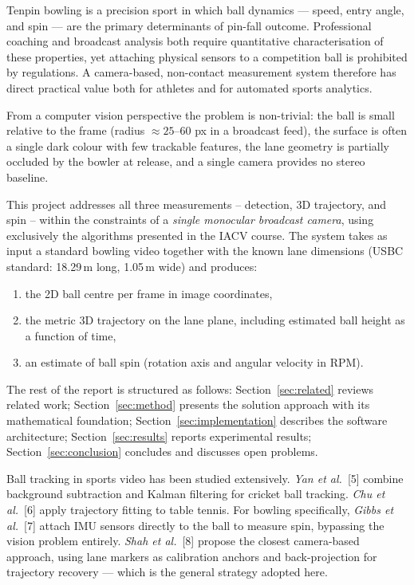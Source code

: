 \documentclass[11pt,twoside]{article}
\begin{document}
Tenpin bowling is a precision sport in which ball dynamics --- speed, entry angle, and spin --- are the primary determinants of pin-fall outcome.
Professional coaching and broadcast analysis both require quantitative characterisation of these properties, yet attaching physical sensors to a competition ball is prohibited by regulations.
A camera-based, non-contact measurement system therefore has direct practical value both for athletes and for automated sports analytics.

From a computer vision perspective the problem is non-trivial: the ball is small relative to the frame (radius $\approx 25$--$60$ px in a broadcast feed), the surface is often a single dark colour with few trackable features, the lane geometry is partially occluded by the bowler at release, and a single camera provides no stereo baseline.

This project addresses all three measurements -- detection, 3D trajectory, and spin -- within the constraints of a \emph{single monocular broadcast camera}, using exclusively the algorithms presented in the IACV course.
The system takes as input a standard bowling video together with the known lane dimensions (USBC standard: 18.29\,m long, 1.05\,m wide) and produces:
\begin{enumerate}
    \item the 2D ball centre per frame in image coordinates,
    \item the metric 3D trajectory on the lane plane, including estimated ball height as a function of time,
    \item an estimate of ball spin (rotation axis and angular velocity in RPM).
\end{enumerate}

The rest of the report is structured as follows: Section~\ref{sec:related} reviews related work; Section~\ref{sec:method} presents the solution approach with its mathematical foundation; Section~\ref{sec:implementation} describes the software architecture; Section~\ref{sec:results} reports experimental results; Section~\ref{sec:conclusion} concludes and discusses open problems.

{}
\label{sec:related}

Ball tracking in sports video has been studied extensively.
\emph{Yan et al.}~[5] combine background subtraction and Kalman filtering for cricket ball tracking.
\emph{Chu et al.}~[6] apply trajectory fitting to table tennis.
For bowling specifically, \emph{Gibbs et al.}~[7] attach IMU sensors directly to the ball to measure spin, bypassing the vision problem entirely.
\emph{Shah et al.}~[8] propose the closest camera-based approach, using lane markers as calibration anchors and back-projection for trajectory recovery --- which is the general strategy adopted here.
\end{document}
